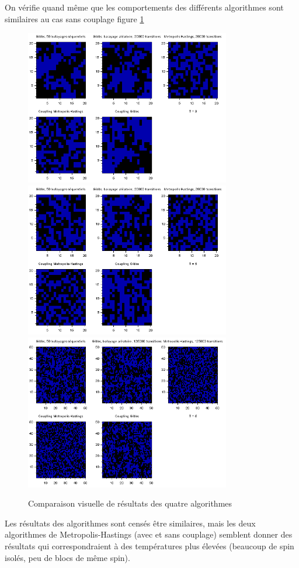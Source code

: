 \documentclass[a4paper,11pt]{article}
\begin{document}
On vérifie quand même que les comportements des différents algorithmes sont similaires au cas sans couplage figure \ref{fig:compar}
\begin{figure}[!htbp]
	\label{fig:compar}
	\includegraphics[width=0.8\textwidth]{comparaison_N20_n50_T3.png}
	\includegraphics[width=0.8\textwidth]{comparaison_N20_n50_T5.png}
	\includegraphics[width=0.8\textwidth]{comparaison_N50_n50_T5.png}
	\caption{Comparaison visuelle de résultats des quatre algorithmes}
\end{figure}
Les résultats des algorithmes sont censés être similaires, mais les deux algorithmes de Metropolis-Hastings (avec et sans couplage) semblent donner des résultats qui correspondraient à des températures plus élevées (beaucoup de spin isolés, peu de blocs de même spin).
\end{document}
